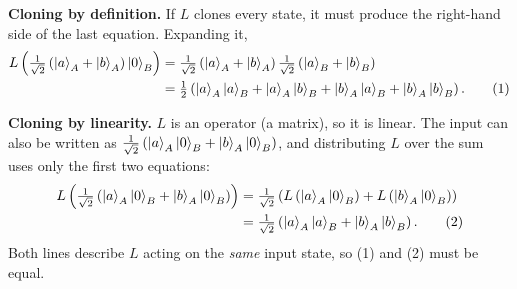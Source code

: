 \documentclass[a4paper, 10pt]{article}
\begin{document}
\begin{solution}
	\noindent \textbf{Cloning by definition.} If \( L \) clones every state, it must produce the right-hand side of the last equation. Expanding it,
	\begin{align*}
		L\left(\tfrac{1}{\sqrt{2}}\left(\ket{a}_A + \ket{b}_A\right)\ket{0}_B\right)
		 & = \tfrac{1}{\sqrt{2}}\left(\ket{a}_A + \ket{b}_A\right) \tfrac{1}{\sqrt{2}}\left(\ket{a}_B + \ket{b}_B\right)              \\
		 & = \tfrac{1}{2}\left(\ket{a}_A\ket{a}_B + \ket{a}_A\ket{b}_B + \ket{b}_A\ket{a}_B + \ket{b}_A\ket{b}_B\right). \tag{1}
	\end{align*}

	\noindent \textbf{Cloning by linearity.} \( L \) is an operator (a matrix), so it is linear. The input can also be written as \( \tfrac{1}{\sqrt{2}}\left(\ket{a}_A\ket{0}_B + \ket{b}_A\ket{0}_B\right) \), and distributing \( L \) over the sum uses only the first two equations:
	\begin{align*}
		L\left(\tfrac{1}{\sqrt{2}}\left(\ket{a}_A\ket{0}_B + \ket{b}_A\ket{0}_B\right)\right)
		 & = \tfrac{1}{\sqrt{2}}\left(L\left(\ket{a}_A\ket{0}_B\right) + L\left(\ket{b}_A\ket{0}_B\right)\right) \\
		 & = \tfrac{1}{\sqrt{2}}\left(\ket{a}_A\ket{a}_B + \ket{b}_A\ket{b}_B\right). \tag{2}
	\end{align*}
	Both lines describe \( L \) acting on the \emph{same} input state, so (1) and (2) must be equal.


\end{solution}
\end{document}

